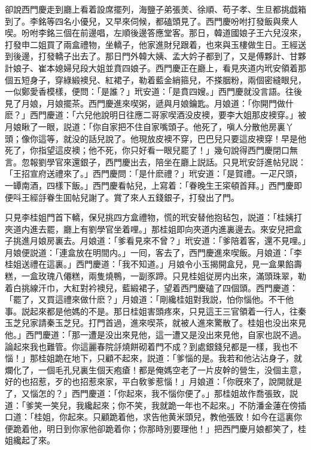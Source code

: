 卻說西門慶走到廳上看着設席擺列，海鹽子弟張羙、徐順、苟子孝、生旦都挑戯箱到了。李銘等四名小優兒，又早來伺候，都磕頭見了。西門慶吩咐打發飯與衆人喫。吩咐李銘三個在前邊唱，左順後邊答應堂客。那日，韓道國娘子王六兒沒來，打發申二姐買了兩盒禮物，坐轎子，他家進財兒跟着，也來與玉樓做生日。王經送到後邊，打發轎子出去了。那日門外韓大姨、孟大妗子都到了，又是傅夥計、甘夥計娘子、崔本媳婦兒段大姐並賁四娘子。西門慶正在廳上，看見夾道内玳安領着那個五短身子，穿綠緞襖兒、紅裙子，勒着藍金綃箍兒，不搽胭粉，兩個密縫眼兒，一似鄭愛香模樣，便問：「是誰？」玳安道：「是賁四嫂。」西門慶就没言語。往後見了月娘，月娘擺茶。西門慶進來喫粥，遞與月娘鑰匙。月娘道：「你開門做什麽？」西門慶道：「六兒他說明日往應二哥家喫酒没皮襖，要李大姐那皮襖穿。」被月娘瞅了一眼，説道：「你自家把不住自家嘴頭子。他死了，嗔人分散他房裏丫頭；像你這等，就没的話兒說了。他現放皮襖不穿，巴巴兒只要這皮襖穿！早是他死了，你指望這皮襖；他不死，你只好看一眼兒罷了！」幾句說得西門慶閉口無言。忽報劉學官來還銀子，西門慶出去，陪坐在廳上説話。只見玳安㧱進帖兒説：「王招宣府送禮來了。」西門慶問：「是什麽禮？」玳安道：「是賀禮。一疋尺頭，一罈南酒，四樣下飯。」西門慶看帖兒，上寫着：「眷晚生王寀頓首拜。」西門慶即便呌王經㧱眷生囬帖兒謝了。賞了來人五錢銀子，打發出了門。

只見李桂姐門首下轎，保兒挑四方盒禮物，慌的玳安替他抱毡包，説道：「桂姨打夾道内進去罷，廳上有劉學官坐着哩。」那桂姐即向夾道内進裏邊去。來安兒把盒子挑進月娘房裏去。月娘道：「爹看見來不曾？」玳安道：「爹陪着客，還不見哩。」月娘便説道：「連盒放在明間内。」一囘，客去了，西門慶進來喫飯。月娘道：「李桂姐送禮在這裏。」西門慶道：「我不知道。」月娘令小玉揭開盒兒，見一盒果餡壽糕，一盒玫瑰八僊糕，兩隻燒鴨，一副豕蹄。只見桂姐従房内出來，滿頭珠翠，勒着白挑線汗巾，大紅對衿襖兒，藍緞裙子，望着西門慶磕了四個頭。西門慶道：「罷了，又買這禮來做什麽？」月娘道：「剛纔桂姐對我説，怕你惱他。不干他事。説起來都是他媽的不是。那日桂姐害頭疼來，只見這王三官領着一行人，往秦玉芝兒家請秦玉芝兒。打門首過，進來喫茶，就被人進來驚散了。桂姐也没出來見他。」西門慶道：「那一遭是没出來見他，這一遭又是没出來見他，自家也説不過。論起來我也難管。你這麗春院㧱燒餅砌着門不成？到處銀錢兒都是一樣，我也不惱！」那桂姐跪在地下，只顧不起來，説道：「爹惱的是。我若和他沾沾身子，就爛化了，一個毛孔兒裏生個天疱瘡！都是俺媽空老了一片皮幹的營生，没個主意，好的也招惹，歹的也招惹來家，平白敎爹惹惱！」月娘道：「你旣來了，說開就是了，又惱怎的？」西門慶道：「你起來，我不惱你便了。」那桂姐故作喬張致，説道：「爹笑一笑兒，我纔起來；你不笑，我就跪一年也不起來。」不防潘金蓮在傍插口道：「桂姐，你起來。只顧跪着他，求告他黄米頭兒，教他張致！如今在這裏你便跪着他，明日到你家他卻跪着你；你那時別要理他！」把西門慶月娘都笑了，桂姐纔起了來。

